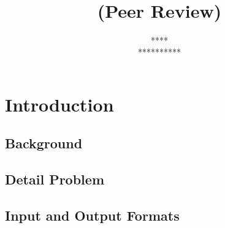 \documentclass[10pt, twoside]{article}
\title{
    \\
    \ \\
    \textbf{\reportname}\\
    \projectname
    \ifIsPR (Peer Review) \fi
}
\author{
    \ifIsPR
        ****\\
        **********
    \else
        \authorname\\
        \authorID
    \fi
}
\begin{document}

\begin{titlingpage}
    \maketitle
    \thispagestyle{empty}
\end{titlingpage}
\newpage

\section{Introduction}
\subsection{Background}

\lipsum[1]

\subsection{Detail Problem}

\lipsum[2-3]

\subsection{Input and Output Formats}

\lipsum[4]
\end{document}
